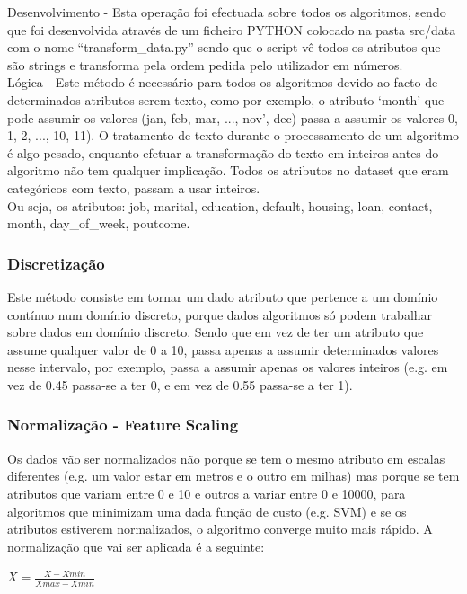 \documentclass[portugues,final]{revdetua}
\begin{document}
Desenvolvimento - Esta operação foi efectuada sobre todos os algoritmos, sendo que foi desenvolvida através de um ficheiro PYTHON colocado na pasta src/data com o nome “transform\_data.py” sendo que o script vê todos os atributos que são strings e transforma pela ordem pedida pelo utilizador em números.\\

Lógica - Este método é necessário para todos os algoritmos devido ao facto de determinados atributos serem texto, como por exemplo, o atributo ‘month’ que pode assumir os valores (jan, feb, mar, ..., nov', dec) passa a assumir os valores 0, 1, 2, ..., 10, 11). O tratamento de texto durante o processamento de um algoritmo é algo pesado, enquanto efetuar a transformação do texto em inteiros antes do algoritmo não tem qualquer implicação.
Todos os atributos no dataset que eram categóricos com texto, passam a usar inteiros.\\
Ou seja, os atributos: job, marital, education, default, housing, loan, contact, month, day\_of\_week, poutcome.

\subsubsection{Discretização}

Este método consiste em tornar um dado atributo que pertence a um domínio contínuo num domínio discreto, porque dados algoritmos só podem trabalhar sobre dados em domínio discreto. Sendo que em vez de ter um atributo que assume qualquer valor de 0 a 10, passa apenas a assumir determinados valores nesse intervalo, por exemplo, passa a assumir apenas os valores inteiros (e.g. em vez de 0.45 passa-se a ter 0, e em vez de 0.55 passa-se a ter 1).

\subsubsection{Normalização - Feature Scaling}

Os dados vão ser normalizados não porque se tem o mesmo atributo em escalas diferentes (e.g. um valor estar em metros e o outro em milhas) mas porque se tem atributos que variam entre 0 e 10 e outros a variar entre 0 e 10000, para algoritmos que minimizam uma dada função de custo (e.g. SVM) e se os atributos estiverem normalizados, o algoritmo converge muito mais rápido.
A normalização que vai ser aplicada é a seguinte: 
\begin{center}{${X} = \frac{X - Xmin}{Xmax - Xmin}$}
\end{center}
\end{document}
